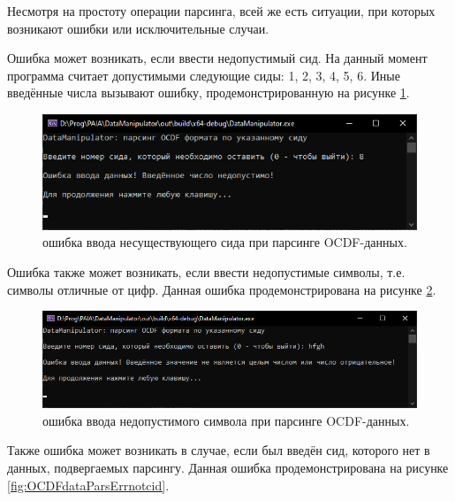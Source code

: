 {\standartFont

  \par Несмотря на простоту операции парсинга, всей же есть ситуации, при которых возникают ошибки или исключительные случаи. 

  \par Ошибка может возникать, если ввести недопустимый сид. На данный момент программа считает допустимыми следующие сиды: 1, 2, 3, 4, 5, 6. Иные введённые числа вызывают ошибку, продемонстрированную на рисунке \ref{fig:OCDFdataParsErrUnkcid}.

  \begin{figure}[H]
    \centering
    \includegraphics{images/forDataManipulator/OCDFdataParsErrUnknowCID.png}
    \caption{ошибка ввода несуществующего сида при парсинге OCDF-данных.} 
    \label{fig:OCDFdataParsErrUnkcid}
  \end{figure}

  \par Ошибка также может возникать, если ввести недопустимые символы, т.е. символы отличные от цифр. Данная ошибка продемонстрирована на рисунке \ref{fig:OCDFdataParsErrInv}.

  \begin{figure}[H]
    \centering
    \includegraphics[width=\textwidth]{images/forDataManipulator/OCDFdataParsErrInvalid.png}
    \caption{ошибка ввода недопустимого символа при парсинге OCDF-данных.} 
    \label{fig:OCDFdataParsErrInv}
  \end{figure}

  \par Также ошибка может возникать в случае, если был введён сид, которого нет в данных, подвергаемых парсингу. Данная ошибка продемонстрирована на рисунке \ref{fig:OCDFdataParsErrnotcid}.

}
